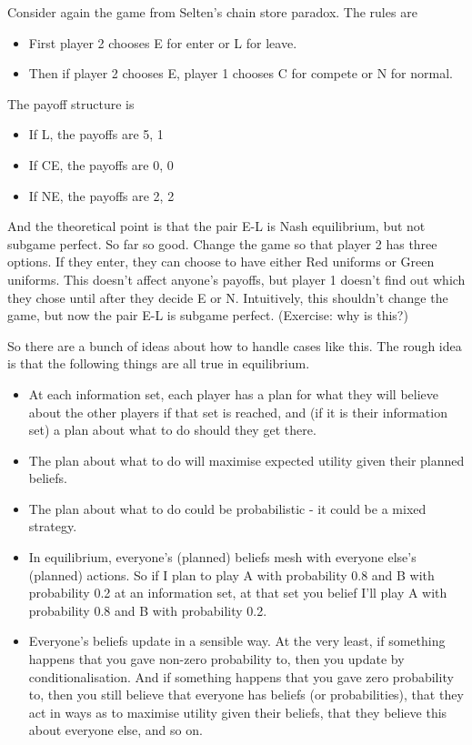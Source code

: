 \documentclass[11pt,]{article}
\providecommand{\tightlist}{%
  \setlength{\itemsep}{0pt}\setlength{\parskip}{0pt}}
\begin{document}
Consider again the game from Selten's chain store paradox. The rules are

\begin{itemize}
\tightlist
\item
  First player 2 chooses E for enter or L for leave.
\item
  Then if player 2 chooses E, player 1 chooses C for compete or N for
  normal.
\end{itemize}

The payoff structure is

\begin{itemize}
\tightlist
\item
  If L, the payoffs are 5, 1
\item
  If CE, the payoffs are 0, 0
\item
  If NE, the payoffs are 2, 2
\end{itemize}

And the theoretical point is that the pair E-L is Nash equilibrium, but
not subgame perfect. So far so good. Change the game so that player 2
has three options. If they enter, they can choose to have either Red
uniforms or Green uniforms. This doesn't affect anyone's payoffs, but
player 1 doesn't find out which they chose until after they decide E or
N. Intuitively, this shouldn't change the game, but now the pair E-L is
subgame perfect. (Exercise: why is this?)

So there are a bunch of ideas about how to handle cases like this. The
rough idea is that the following things are all true in equilibrium.

\begin{itemize}
\tightlist
\item
  At each information set, each player has a plan for what they will
  believe about the other players if that set is reached, and (if it is
  their information set) a plan about what to do should they get there.
\item
  The plan about what to do will maximise expected utility given their
  planned beliefs.
\item
  The plan about what to do could be probabilistic - it could be a mixed
  strategy.
\item
  In equilibrium, everyone's (planned) beliefs mesh with everyone else's
  (planned) actions. So if I plan to play A with probability 0.8 and B
  with probability 0.2 at an information set, at that set you belief
  I'll play A with probability 0.8 and B with probability 0.2.
\item
  Everyone's beliefs update in a sensible way. At the very least, if
  something happens that you gave non-zero probability to, then you
  update by conditionalisation. And if something happens that you gave
  zero probability to, then you still believe that everyone has beliefs
  (or probabilities), that they act in ways as to maximise utility given
  their beliefs, that they believe this about everyone else, and so on.
\end{itemize}
\end{document}
